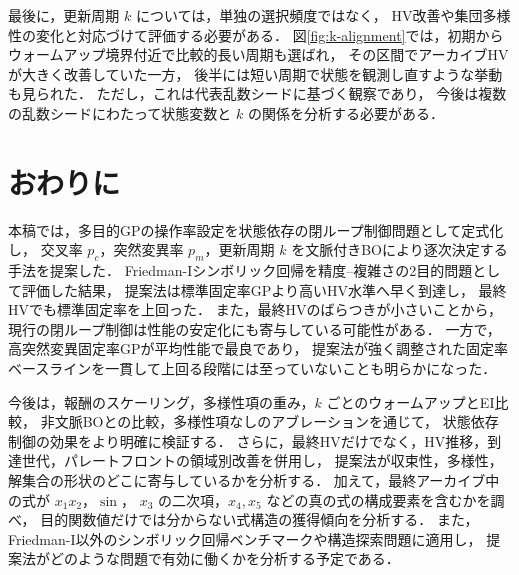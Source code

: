 \documentclass[a4paper,10pt,twocolumn]{ltjsarticle}
\begin{document}
最後に，更新周期 \(k\) については，単独の選択頻度ではなく，
HV改善や集団多様性の変化と対応づけて評価する必要がある．
図\ref{fig:k-alignment}では，初期からウォームアップ境界付近で比較的長い周期も選ばれ，
その区間でアーカイブHVが大きく改善していた一方，
後半には短い周期で状態を観測し直すような挙動も見られた．
ただし，これは代表乱数シードに基づく観察であり，
今後は複数の乱数シードにわたって状態変数と \(k\) の関係を分析する必要がある．

\section{おわりに}

本稿では，多目的GPの操作率設定を状態依存の閉ループ制御問題として定式化し，
交叉率 \(p_c\)，突然変異率 \(p_m\)，更新周期 \(k\) を文脈付きBOにより逐次決定する手法を提案した．
Friedman-Iシンボリック回帰を精度--複雑さの2目的問題として評価した結果，
提案法は標準固定率GPより高いHV水準へ早く到達し，
最終HVでも標準固定率を上回った．
また，最終HVのばらつきが小さいことから，
現行の閉ループ制御は性能の安定化にも寄与している可能性がある．
一方で，高突然変異固定率GPが平均性能で最良であり，
提案法が強く調整された固定率ベースラインを一貫して上回る段階には至っていないことも明らかになった．

今後は，報酬のスケーリング，多様性項の重み，\(k\) ごとのウォームアップとEI比較，
非文脈BOとの比較，多様性項なしのアブレーションを通じて，
状態依存制御の効果をより明確に検証する．
さらに，最終HVだけでなく，HV推移，到達世代，パレートフロントの領域別改善を併用し，
提案法が収束性，多様性，解集合の形状のどこに寄与しているかを分析する．
加えて，最終アーカイブ中の式が \(x_1x_2\)，\(\sin\)，
\(x_3\) の二次項，\(x_4,x_5\) などの真の式の構成要素を含むかを調べ，
目的関数値だけでは分からない式構造の獲得傾向を分析する．
また，Friedman-I以外のシンボリック回帰ベンチマークや構造探索問題に適用し，
提案法がどのような問題で有効に働くかを分析する予定である．
\end{document}
